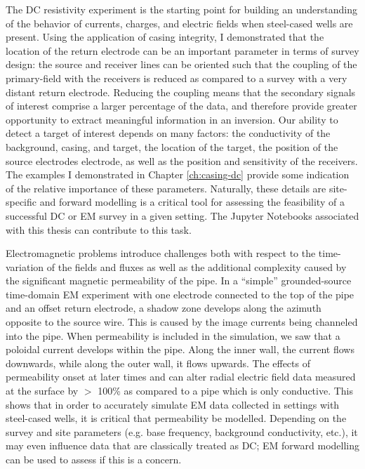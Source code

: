 The DC resistivity experiment is the starting point for building an understanding of the behavior of currents, charges, and electric fields when steel-cased wells are present. Using the application of casing integrity, I demonstrated that the location of the return electrode can be an important parameter in terms of survey design: the source and receiver lines can be oriented such that the coupling of the primary-field with the receivers is reduced as compared to a survey with a very distant return electrode. Reducing the coupling means that the secondary signals of interest comprise a larger percentage of the data, and therefore provide greater opportunity to extract meaningful information in an inversion. Our ability to detect a target of interest depends on many factors: the conductivity of the background, casing, and target, the location of the target, the position of the source electrodes electrode, as well as the position and sensitivity of the receivers. The examples I demonstrated in Chapter \ref{ch:casing-dc} provide some indication of the relative importance of these parameters. Naturally, these details are site-specific and forward modelling is a critical tool for assessing the feasibility of a successful DC or EM survey in a given setting. The Jupyter Notebooks associated with this thesis can contribute to this task.

Electromagnetic problems introduce challenges both with respect to the time-variation of the fields and fluxes as well as the additional complexity caused by the significant magnetic permeability of the pipe. In a ``simple'' grounded-source time-domain EM experiment with one electrode connected to the top of the pipe and an offset return electrode, a shadow zone develops along the azimuth opposite to the source wire. This is caused by the image currents being channeled into the pipe. When permeability is included in the simulation, we saw that a poloidal current develops within the pipe. Along the inner wall, the current flows downwards, while along the outer wall, it flows upwards. The effects of permeability onset at later times and can alter radial electric field data measured at the surface by $>$ 100\% as compared to a pipe which is only conductive. This shows that in order to accurately simulate EM data collected in settings with steel-cased wells, it is critical that permeability be modelled. Depending on the survey and site parameters (e.g. base frequency, background conductivity, etc.), it may even influence data that are classically treated as DC; EM forward modelling can be used to assess if this is a concern.

